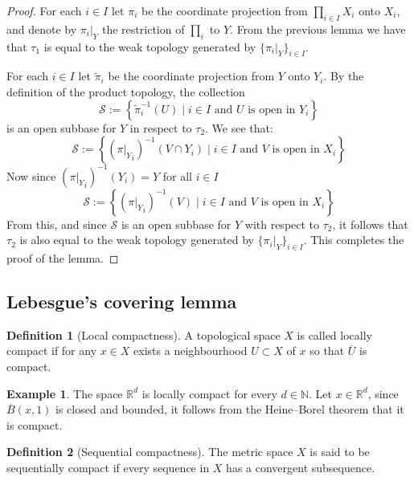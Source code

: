 \documentclass[11pt,a4paper]{article}
\theoremstyle{definition}
\newtheorem{definition}{Definition}[section]
\newtheorem{example}{Example}[section]
\theoremstyle{plain}
\newcommand{\N}{\mathbb{N}}
\newcommand{\R}{\mathbb{R}}
\newcommand{\set}[2]{ \left\{ #1 \mid #2 \right\} }
\begin{document}
  \begin{proof}
    For each $i \in I$ let $\pi_i$ be the coordinate projection from 
    $\prod_{i \in I}{X_i}$ onto $X_i$, and denote by $\pi_i\vert_Y$ the 
    restriction of $\prod_i$ to $Y$. From the previous lemma we have
    that $\tau_1$ is equal to the weak topology generated by 
    $\{\pi_i \vert_Y\}_{i \in I}$. 
    
    For each $i \in I$ let $\tilde{\pi}_i$ be the coordinate projection from 
    $Y$ onto $Y_i$. By the definition of the product topology, the collection
    \[
      \mathcal{S} := \set{\tilde{\pi}_{i}^{-1}(U)}
      {\text{$i \in I$ and $U$ is open in $Y_i$}}
    \]
    is an open subbase for $Y$ in respect to $\tau_2$. We see that:
    \[
      \mathcal{S} := \set{({\pi \vert_Y}_{i})^{-1}(V \cap Y_i)}
      {\text{$i \in I$ and $V$ is open in $X_i$}}
    \]
    Now since $({\pi \vert_Y}_{i})^{-1}(Y_i) = Y$ for all $i \in I$
    \[
      \mathcal{S} := \set{({\pi \vert_Y}_{i})^{-1}(V)}
      {\text{$i \in I$ and $V$ is open in $X_i$}}
    \]
    From this, and since $\mathcal{S}$ is an open subbase for $Y$ with 
    respect to $\tau_2$, it follows that $\tau_2$ is also equal to the weak 
    topology generated by $\{\pi_i \vert_Y\}_{i \in I}$. This completes the
    proof of the lemma.
  \end{proof}

  \subsection{Lebesgue’s covering lemma}

  \begin{definition}[Local compactness]
    A topological space $X$ is called locally compact if for
    any $x \in X$ exists a neighbourhood $U \subset X$ of $x$ so that
    $\overline{U}$ is compact.
  \end{definition}

  \begin{example}
    The space $\R^d$ is locally compact for every $d \in \N$. 
    Let $x \in \R^d$, since $\overline B(x,1)$ is closed and bounded,
    it follows from the Heine--Borel theorem that it is compact.
  \end{example}
  
  \begin{definition}[Sequential compactness]
    The metric space $X$ is said to be sequentially compact
    if every sequence in $X$ has a convergent subsequence.
  \end{definition}
\end{document}
